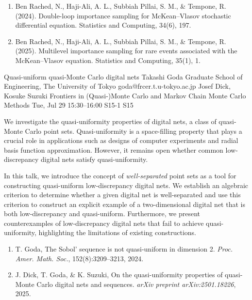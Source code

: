 \begin{talk}
\begin{enumerate}
 \item[{[1]}] Ben Rached, N., Haji-Ali, A. L., Subbiah Pillai, S. M., \& Tempone, R. (2024). Double-loop importance sampling for McKean--Vlasov stochastic differential equation. Statistics and Computing, 34(6), 197.
 \item[{[2]}] Ben Rached, N., Haji-Ali, A. L., Subbiah Pillai, S. M., \& Tempone, R. (2025). Multilevel importance sampling for rare events associated with the McKean--Vlasov equation. Statistics and Computing, 35(1), 1.
\end{enumerate}

\end{talk}

\begin{talk}
  {Quasi-uniform quasi-Monte Carlo digital nets}%
  {Takashi Goda}%
  {Graduate School of Engineering, The University of Tokyo}%
  {goda@frcer.t.u-tokyo.ac.jp}%
  {Josef Dick, Kosuke Suzuki}%
  {Frontiers in (Quasi-)Monte Carlo and Markov Chain Monte Carlo Methods}%
  {Tue, Jul 29 15:30--16:00}%
  {S15-1}%
  {S15}%
    
   
We investigate the quasi-uniformity properties of digital nets, a class of quasi-Monte Carlo point sets. Quasi-uniformity is a space-filling property that plays a crucial role in applications such as designs of computer experiments and radial basis function approximation. However, it remains open whether common low-discrepancy digital nets satisfy quasi-uniformity.

In this talk, we introduce the concept of \emph{well-separated} point sets as a tool for constructing quasi-uniform low-discrepancy digital nets. We establish an algebraic criterion to determine whether a given digital net is well-separated and use this criterion to construct an explicit example of a two-dimensional digital net that is both low-discrepancy and quasi-uniform. Furthermore, we present counterexamples of low-discrepancy digital nets that fail to achieve quasi-uniformity, highlighting the limitations of existing constructions.

\begin{enumerate}
 \item[{[1]}] T. Goda, The Sobol’ sequence is not quasi-uniform in dimension 2. \emph{Proc. Amer. Math. Soc.}, 152(8):3209--3213, 2024.
 \item[{[2]}] J. Dick, T. Goda, \& K. Suzuki, On the quasi-uniformity properties of quasi-Monte Carlo digital nets and sequences. \emph{arXiv preprint arXiv:2501.18226}, 2025.
\end{enumerate}
\end{talk}

